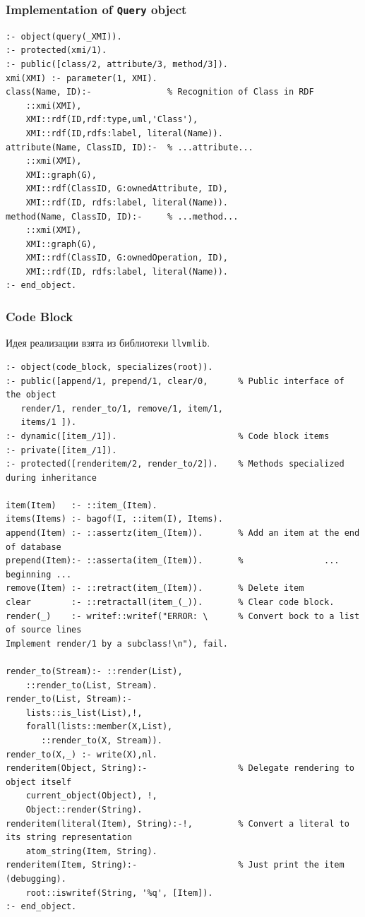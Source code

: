 \documentclass[10pt]{beamer}
\begin{document}
\begin{frame}[fragile]
  \frametitle{Implementation of \texttt{Query} object}
\begin{verbatim}
:- object(query(_XMI)).
:- protected(xmi/1).
:- public([class/2, attribute/3, method/3]).
xmi(XMI) :- parameter(1, XMI).
class(Name, ID):-               % Recognition of Class in RDF
    ::xmi(XMI),
    XMI::rdf(ID,rdf:type,uml,'Class'),
    XMI::rdf(ID,rdfs:label, literal(Name)).
attribute(Name, ClassID, ID):-  % ...attribute...
    ::xmi(XMI),
    XMI::graph(G),
    XMI::rdf(ClassID, G:ownedAttribute, ID),
    XMI::rdf(ID, rdfs:label, literal(Name)).
method(Name, ClassID, ID):-     % ...method...
    ::xmi(XMI),
    XMI::graph(G),
    XMI::rdf(ClassID, G:ownedOperation, ID),
    XMI::rdf(ID, rdfs:label, literal(Name)).
:- end_object.
\end{verbatim}
\end{frame}

\begin{frame}[fragile]
  \frametitle{Code Block}
  Идея реализации взята из библиотеки \verb|llvmlib|.
\begin{verbatim}
:- object(code_block, specializes(root)).
:- public([append/1, prepend/1, clear/0,      % Public interface of the object
   render/1, render_to/1, remove/1, item/1,
   items/1 ]).
:- dynamic([item_/1]).                        % Code block items
:- private([item_/1]).
:- protected([renderitem/2, render_to/2]).    % Methods specialized during inheritance

item(Item)   :- ::item_(Item).
items(Items) :- bagof(I, ::item(I), Items).
append(Item) :- ::assertz(item_(Item)).       % Add an item at the end of database
prepend(Item):- ::asserta(item_(Item)).       %                ... beginning ...
remove(Item) :- ::retract(item_(Item)).       % Delete item
clear        :- ::retractall(item_(_)).       % Clear code block.
render(_)    :- writef::writef("ERROR: \      % Convert bock to a list of source lines
Implement render/1 by a subclass!\n"), fail.

render_to(Stream):- ::render(List),
    ::render_to(List, Stream).
render_to(List, Stream):-
    lists::is_list(List),!,
    forall(lists::member(X,List),
       ::render_to(X, Stream)).
render_to(X,_) :- write(X),nl.
renderitem(Object, String):-                  % Delegate rendering to object itself
    current_object(Object), !,
    Object::render(String).
renderitem(literal(Item), String):-!,         % Convert a literal to its string representation
    atom_string(Item, String).
renderitem(Item, String):-                    % Just print the item (debugging).
    root::iswritef(String, '%q', [Item]).
:- end_object.
\end{verbatim}
\end{frame}
\end{document}
